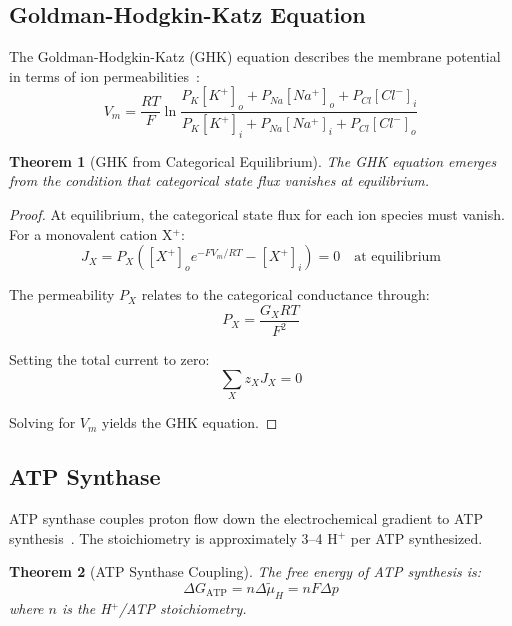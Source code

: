 \documentclass[twocolumn,showpacs,preprintnumbers,amsmath,amssymb,prd]{revtex4-2}
\newtheorem{theorem}{Theorem}[section]
\begin{document}
\subsection{Goldman-Hodgkin-Katz Equation}

The Goldman-Hodgkin-Katz (GHK) equation describes the membrane potential in terms of ion permeabilities~\cite{Hille2001}:
\begin{equation}
V_m = \frac{RT}{F}\ln\frac{P_K[K^+]_o + P_{Na}[Na^+]_o + P_{Cl}[Cl^-]_i}{P_K[K^+]_i + P_{Na}[Na^+]_i + P_{Cl}[Cl^-]_o}
\label{eq:ghk}
\end{equation}

\begin{theorem}[GHK from Categorical Equilibrium]
\label{thm:ghk}
The GHK equation emerges from the condition that categorical state flux vanishes at equilibrium.
\end{theorem}

\begin{proof}
At equilibrium, the categorical state flux for each ion species must vanish. For a monovalent cation X$^+$:
\begin{equation}
J_X = P_X\left([X^+]_o e^{-FV_m/RT} - [X^+]_i\right) = 0 \quad \text{at equilibrium}
\label{eq:categorical_flux_ion}
\end{equation}

The permeability $P_X$ relates to the categorical conductance through:
\begin{equation}
P_X = \frac{G_X RT}{F^2}
\label{eq:permeability_conductance}
\end{equation}

Setting the total current to zero:
\begin{equation}
\sum_X z_X J_X = 0
\label{eq:total_current_zero}
\end{equation}

Solving for $V_m$ yields the GHK equation.
\end{proof}

\subsection{ATP Synthase}

ATP synthase couples proton flow down the electrochemical gradient to ATP synthesis~\cite{Boyer1997}. The stoichiometry is approximately 3--4 H$^+$ per ATP synthesized.

\begin{theorem}[ATP Synthase Coupling]
\label{thm:atp_synthase}
The free energy of ATP synthesis is:
\begin{equation}
\Delta G_{\text{ATP}} = n \Delta\tilde{\mu}_H = n F \Delta p
\label{eq:atp_coupling}
\end{equation}
where $n$ is the H$^+$/ATP stoichiometry.
\end{theorem}
\end{document}
